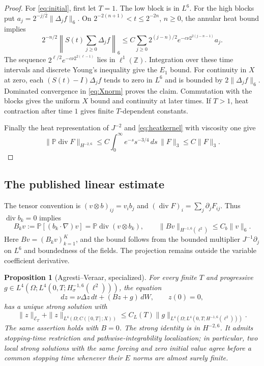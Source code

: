 \documentclass[11pt]{article}
\newcommand{\Z}{\mathbb Z}
\newcommand{\Pp}{\mathbb P}
\newtheorem{proposition}[theorem]{Proposition}
\numberwithin{equation}{section}
\begin{document}
\begin{proof}
For \eqref{eq:initial}, first let $T=1$. The low block is in $L^6$.
For the high blocks put $a_j=2^{-j/2}\|\Delta_jf\|_6$.
On $2^{-2(n+1)}<t\leq2^{-2n}$, $n\geq0$, the annular heat bound implies
\[
 2^{-n/2}\left\|S(t)\sum_{j\geq0}\Delta_jf\right\|_6
 \leq C\sum_{j\geq0}2^{(j-n)/2}
                  e^{-c\nu2^{2(j-n-1)}}a_j.
\]
The sequence $2^{\ell/2}e^{-c\nu2^{2(\ell-1)}}$ lies in $\ell^1(\Z)$.
Integration over these time intervals and discrete Young's inequality give
the $E_1$ bound. For continuity in $X$ at zero, each
$(S(t)-I)\Delta_jf$ tends to zero in $L^6$ and is bounded by
$2\|\Delta_jf\|_6$. Dominated convergence in \eqref{eq:Xnorm} proves the
claim. Commutation with the blocks gives the uniform $X$ bound and continuity
at later times. If $T>1$, heat contraction after time $1$ gives finite
$T$-dependent constants.

Finally the heat representation of $J^{-2}$ and \eqref{eq:heatkernel} with
viscosity one give
\[
 \|\Pp\operatorname{div}F\|_{H^{-2,6}}
 \leq C\int_0^\infty e^{-s}s^{-3/4}\,ds\,\|F\|_3
 \leq C\|F\|_3.
\]
\end{proof}

\subsection{The published linear estimate}
The tensor convention is $(v\otimes b)_{ij}=v_i b_j$ and
$(\operatorname{div}F)_i=\sum_j\partial_jF_{ij}$. Thus $\operatorname{div}b_k=0$
implies
\begin{equation}\label{eq:Bbound}
 B_kv:=\Pp[(b_k\cdot\nabla)v]=\Pp\operatorname{div}(v\otimes b_k),
 \qquad
 \|Bv\|_{H^{-1,6}(\ell^2)}\leq C_b\|v\|_6.
\end{equation}
Here $Bv=(B_kv)_{k=1}^K$, and the bound follows from the bounded multiplier
$J^{-1}\partial_j$ on $L^6$ and boundedness of the fields.
The projection remains outside the variable coefficient derivative.

\begin{proposition}[Agresti--Veraar, specialized]\label{prop:linear}
For every finite $T$ and progressive
$g\in L^4(\Omega;L^4(0,T;H^{-1,6}_\sigma(\ell^2)))$, the equation
\begin{equation}\label{eq:linear}
 dz=\nu\Delta z\,dt+(Bz+g)\,dW,\qquad z(0)=0,
\end{equation}
has a unique strong solution with
\begin{equation}\label{eq:linearbound}
 \|z\|_{\mathcal E_T}
 +\|z\|_{L^4(\Omega;C([0,T];X))}
 \leq C_L(T)\|g\|_{L^4(\Omega;L^4(0,T;H^{-1,6}(\ell^2)))}.
\end{equation}
The same assertion holds with $B=0$. The strong identity is in $H^{-2,6}$.
It admits stopping-time restriction and pathwise-integrability localization;
in particular, two local strong solutions with the same forcing and zero
initial value agree before a common stopping time whenever their $E$ norms
are almost surely finite.
\end{proposition}
\end{document}
